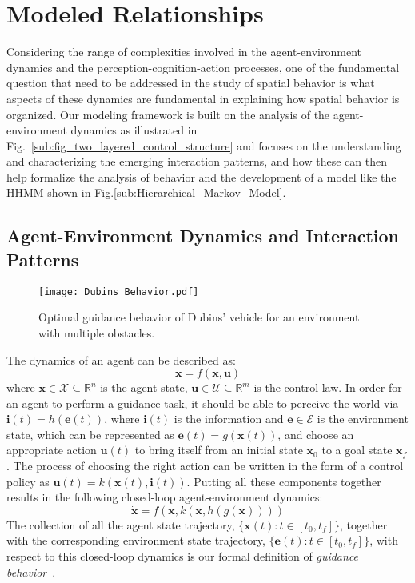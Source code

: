 \documentclass[journal]{IEEEtran}
\begin{document}
\section{Modeled Relationships}



Considering the range of complexities involved in the agent-environment dynamics and the perception-cognition-action processes, one of the fundamental question that need to be addressed in the study of spatial behavior is what aspects of these dynamics are fundamental in explaining how spatial behavior is organized.  Our modeling framework is built on the analysis of the agent-environment dynamics  as illustrated in Fig.~\ref{sub:fig_two_layered_control_structure} and focuses on the understanding and characterizing the emerging interaction patterns, and how these can then help formalize the analysis of behavior and the development of a model like the HHMM shown in Fig.\ref{sub:Hierarchical_Markov_Model}. 


\subsection{Agent-Environment Dynamics and Interaction Patterns}

\begin{figure}[!t]
\centering   \texttt{[image: Dubins\_Behavior.pdf]}
    \caption{Optimal guidance behavior of Dubins' vehicle for an environment with multiple obstacles.}
    \label{f:Dubins_Behavior}
\end{figure}



The dynamics of an agent can be described as:
\begin{equation}
\dot{\mathbf{x}} = f(\mathbf{x},\mathbf{u}) \label{e:agent_dynamics}
\end{equation}
where $\mathbf{x} \in \mathcal{X} \subseteq \mathbb{R}^n$ is the agent state, $\mathbf{u} \in \mathcal{U} \subseteq \mathbb{R}^m$ is the control law. In order for an agent to perform a guidance task, it should be able to perceive the world via $\mathbf{i}(t) = h(\mathbf{e}(t))$, where $\mathbf{i}(t)$ is the information and $\mathbf{e} \in \mathcal{E}$ is the environment state, which can be represented as $\mathbf{e}(t) = g(\mathbf{x}(t))$, and choose an appropriate action $\mathbf{u}(t)$ to bring itself from an initial state $\mathbf{x}_0$ to a goal state $\mathbf{x}_f$. The process of choosing the right action can be written in the form of a control policy as $\mathbf{u}(t) = k(\mathbf{x}(t),\mathbf{i}(t))$. Putting all these components together results in the following closed-loop agent-environment dynamics:
\begin{equation}
\dot{\mathbf{x}} = f(\mathbf{x},k(\mathbf{x},h(g(\mathbf{x}))))
\label{e:behavior_definition}
\end{equation} 
The collection of all the agent state trajectory, $\{\mathbf{x}(t): t \in [t_0,t_f]\}$, together with the corresponding environment state trajectory, $\{\mathbf{e}(t): t \in [t_0,t_f]\}$, with respect to this closed-loop dynamics is our formal definition of \textit{guidance behavior}~\cite{kong2011foundations}. 
\end{document}
